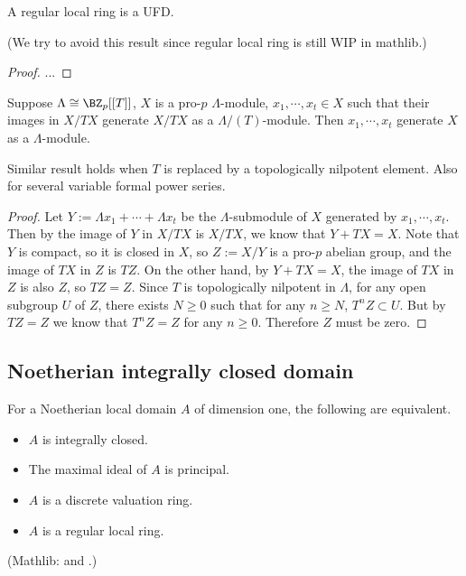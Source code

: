 \begin{thm}
\label{regular-local-ring-is-UFD}
A regular local ring is a UFD.

(We try to avoid this result since regular local ring is still WIP in mathlib.)
\end{thm}

\begin{proof}
...
\end{proof}

\begin{lem}\label{p:nak}
Suppose $\Lambda\cong\BZ_p[[T]]$,
$X$ is a pro-$p$ $\Lambda$-module,
$x_1,\cdots,x_t\in X$ such that their images in $X/TX$
generate $X/TX$ as a $\Lambda/(T)$-module.
Then $x_1,\cdots,x_t$ generate $X$ as a $\Lambda$-module.
\end{lem}

Similar result holds when $T$ is replaced
by a topologically nilpotent element.
Also for several variable formal power series.

\begin{proof}
Let $Y:=\Lambda x_1+\cdots+\Lambda x_t$ be the $\Lambda$-submodule
of $X$ generated by $x_1,\cdots,x_t$.
Then by the image of $Y$ in $X/TX$ is $X/TX$,
we know that $Y+TX=X$. Note that $Y$ is compact,
so it is closed in $X$, so $Z:=X/Y$ is a pro-$p$ abelian group,
and the image of $TX$ in $Z$ is $TZ$.
On the other hand, by $Y+TX=X$, the image of $TX$ in $Z$
is also $Z$, so $TZ=Z$. Since $T$ is topologically nilpotent in $\Lambda$,
for any open subgroup $U$ of $Z$, there exists $N\geq 0$ such that
for any $n\geq N$, $T^nZ\subset U$. But by $TZ=Z$ we know that
$T^nZ=Z$ for any $n\geq 0$. Therefore $Z$ must be zero.
\end{proof}

\subsection{Noetherian integrally closed domain}

\begin{prop}
\label{noeth-local-domain-is-icd-iff}
\leanok
For a Noetherian local domain $A$ of dimension one, the following are equivalent.
\begin{itemize}
\item
$A$ is integrally closed.
\item
The maximal ideal of $A$ is principal.
\item
$A$ is a discrete valuation ring.
\item
$A$ is a regular local ring.
\end{itemize}
(Mathlib:  and
.)
\end{prop}

